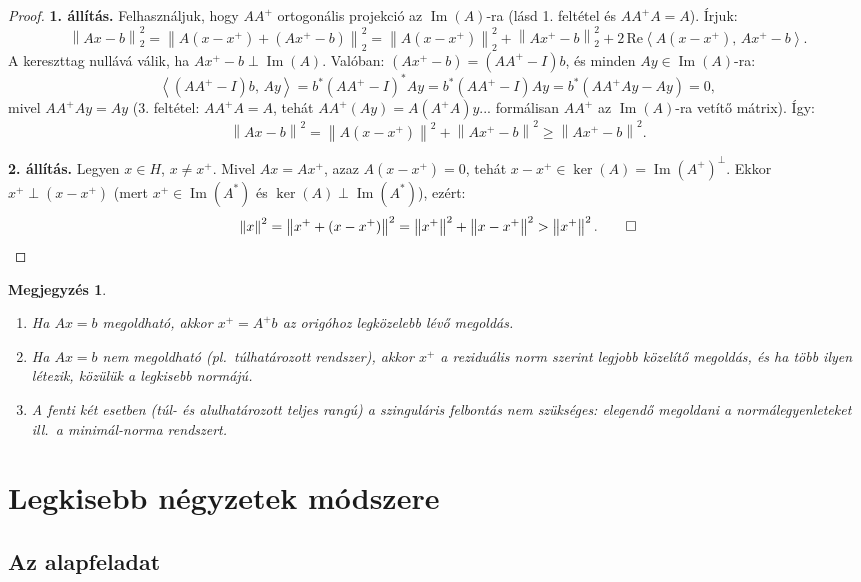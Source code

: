 \documentclass[a4paper,12pt]{article}
\theoremstyle{mydef}
\newtheorem{megjegyzes}[tetel]{Megjegyzés}
\newcommand{\norm}[1]{\left\|#1\right\|}
\newcommand{\innerprod}[2]{\left\langle #1,\,#2 \right\rangle}
\DeclareMathOperator{\Ker}{ker}
\DeclareMathOperator{\Kep}{Im}
\begin{document}
\begin{proof}
\textbf{1. állítás.}
Felhasználjuk, hogy $AA^+$ ortogonális projekció az $\Kep(A)$-ra (lásd 1. feltétel és $AA^+A=A$).
Írjuk:
\[
  \norm{Ax - b}_2^2 = \norm{A(x - x^+) + (Ax^+ - b)}_2^2
  = \norm{A(x-x^+)}_2^2 + \norm{Ax^+ - b}_2^2 + 2\,\mathrm{Re}\innerprod{A(x-x^+)}{Ax^+-b}.
\]
A kereszttag nullává válik, ha $Ax^+ - b \perp \Kep(A)$. Valóban:
$(Ax^+-b) = (AA^+-I)b$, és minden $Ay \in \Kep(A)$-ra:
\[
  \innerprod{(AA^+-I)b}{Ay} = b^*(AA^+-I)^*Ay = b^*(AA^+-I)Ay = b^*(AA^+Ay - Ay) = 0,
\]
mivel $AA^+Ay = Ay$ (3. feltétel: $AA^+A = A$, tehát $AA^+(Ay) = A(A^+A)y$... formálisan
$AA^+$ az $\Kep(A)$-ra vetítő mátrix). Így:
\[
  \norm{Ax-b}^2 = \norm{A(x-x^+)}^2 + \norm{Ax^+-b}^2 \ge \norm{Ax^+-b}^2.
\]

\textbf{2. állítás.}
Legyen $x \in H$, $x \ne x^+$. Mivel $Ax = Ax^+$, azaz $A(x - x^+) = 0$,
tehát $x - x^+ \in \Ker(A) = \Kep(A^+)^\perp$. Ekkor $x^+ \perp (x - x^+)$ (mert $x^+ \in \Kep(A^*)$
és $\Ker(A) \perp \Kep(A^*)$), ezért:
\[
  \norm{x}^2 = \norm{x^+ + (x-x^+)}^2 = \norm{x^+}^2 + \norm{x-x^+}^2 > \norm{x^+}^2. \qed
\]
\end{proof}

\begin{megjegyzes}
\leavevmode
\begin{enumerate}[noitemsep,topsep=2pt]
  \item Ha $Ax = b$ megoldható, akkor $x^+ = A^+b$ az origóhoz legközelebb lévő megoldás.
  \item Ha $Ax = b$ nem megoldható (pl.\ túlhatározott rendszer), akkor $x^+$ a
        \emph{reziduális norm} szerint legjobb közelítő megoldás, és ha több ilyen létezik,
        közülük a legkisebb normájú.
  \item A fenti két esetben (túl- és alulhatározott teljes rangú) a szinguláris felbontás
        nem szükséges: elegendő megoldani a normálegyenleteket ill.\ a minimál-norma rendszert.
\end{enumerate}
\end{megjegyzes}

\section{Legkisebb négyzetek módszere}
\label{sec:lnm}

\subsection*{Az alapfeladat}
\end{document}
